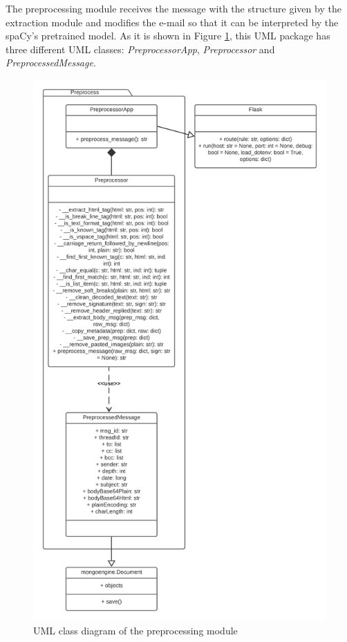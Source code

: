 The preprocessing module receives the message with the structure given by the extraction module and modifies the e-mail so that it can be interpreted by the spaCy's pretrained model. As it is shown in Figure \ref{fig:umlprep}, this UML package has three different UML classes: \textit{PreprocessorApp}, \textit{Preprocessor} and \textit{PreprocessedMessage}.

\begin{figure}[p]
	\centering%
	\centerline{\includegraphics[height=0.85\paperheight]{Imagenes/Bitmap/Analyser/preprocessUML.png}}%
	\caption{UML class diagram of the preprocessing module}%
	\label{fig:umlprep}
\end{figure}

